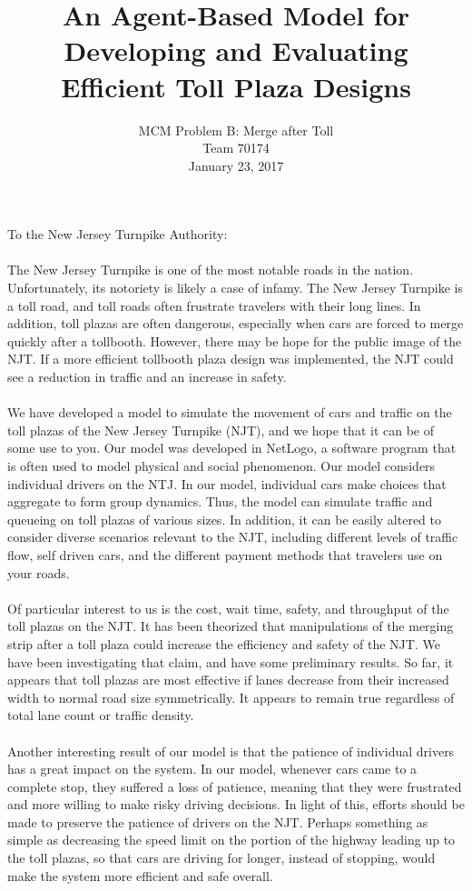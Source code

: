 \documentclass{article}
\title{An Agent-Based Model for Developing and Evaluating \\ Efficient Toll Plaza Designs}
\date{\large MCM Problem B: Merge after Toll \\ Team 70174 \\ January 23, 2017}
\begin{document}
\maketitle

\newpage

\noindent To the New Jersey Turnpike Authority: \\
\\
The New Jersey Turnpike is one of the most notable roads in the nation. Unfortunately, its notoriety is likely a case of infamy. The New Jersey Turnpike is a toll road, and toll roads often frustrate travelers with their long lines. In addition, toll plazas are often dangerous, especially when  cars are forced to merge quickly after a tollbooth. However, there may be hope for the public image of the NJT. If a more efficient tollbooth plaza design was implemented, the NJT could see a reduction in traffic and an increase in safety.\\ \\
We have developed a model to simulate the movement of cars and traffic on the toll plazas of the New Jersey Turnpike (NJT), and we hope that it can be of some use to you. Our model was developed in NetLogo, a software program that is often used to model physical and social phenomenon. Our model considers individual drivers on the NTJ. In our model, individual cars make choices that aggregate to form group dynamics. Thus, the model can simulate traffic and queueing on toll plazas of various sizes. In addition, it can be easily altered to consider diverse scenarios relevant to the NJT, including different levels of traffic flow, self driven cars, and the different payment methods that travelers use on your roads.\\ \\
Of particular interest to us is the cost, wait time, safety, and throughput of the toll plazas on the NJT. It has been theorized that manipulations of the merging strip after a toll plaza could increase the efficiency and safety of the NJT. We have been investigating that claim, and have some preliminary results. So far, it appears that toll plazas are most effective if lanes decrease from their increased width to normal road size symmetrically. It appears to remain true regardless of total lane count or traffic density.\\ \\
Another interesting result of our model  is that the patience of individual drivers has a great impact on the system. In our model, whenever cars came to a complete stop, they suffered a loss of patience, meaning that they were frustrated and more willing to make risky driving decisions. In light of this, efforts should be made to preserve the patience of drivers on the NJT. Perhaps something as simple as decreasing the speed limit on the portion of the highway leading up to the toll plazas, so that cars are driving for longer, instead of stopping, would make the system more efficient and safe overall. \\ \\
\end{document}
